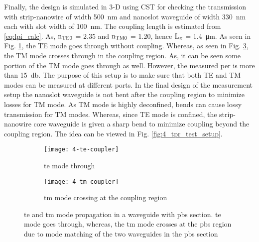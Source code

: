 \documentclass[../report.tex]{subfiles}
\begin{document}
\noindent Finally, the design is simulated in 3-D using CST for checking the transmission with strip-nanowire of width \SI{500}{\nano \meter} and nanoslot waveguide of width \SI{330}{\nano \meter} each with slot width of \SI{100}{\nano \meter}. The coupling length is estimated from \ref{eq:lpi_calc}. As, $\mathrm{n_{TE0}}$ = 2.35 and $\mathrm{n_{TM0}}$ = 1.20, hence $\mathrm{L_{\pi}}$ = \SI{1.4}{\micro\meter}. As seen in Fig. \ref{fig:4_te_coupler}, the TE mode goes through without coupling. Whereas, as seen in Fig. \ref{fig:4_tm_coupler}, the TM mode crosses through in the coupling region. As, it can be seen some portion of the TM mode goes through as well. However, the measured \gls{per} is more than \SI{15}{\decibel}. The purpose of this setup is to make sure that both TE and TM modes can be measured at different ports. In the final design of the measurement setup the nanoslot waveguide is not bent after the coupling region to minimize losses for TM mode. As TM mode is highly deconfined, bends can cause lossy transmission for TM modes. Whereas, since TE mode is confined, the strip-nanowire core waveguide is given a sharp bend to minimize coupling beyond the coupling region. The idea can be viewed in Fig. \ref{fig:4_tpr_test_setup}.

\begin{figure}[H] %
	\begin{subfigure}[t]{0.45\textwidth}
		\texttt{[image: 4-te-coupler]}
		\caption{\gls{te} mode through}
		\label{fig:4_te_coupler}
	\end{subfigure}
	\hfill
	\begin{subfigure}[t]{0.45\textwidth}
		\texttt{[image: 4-tm-coupler]}
		\caption{\gls{tm} mode crossing at the coupling region}
		\label{fig:4_tm_coupler}
	\end{subfigure}
	\caption{\gls{te} and \gls{tm} mode propagation in a waveguide with \gls{pbs} section. \gls{te} mode goes through, whereas, the \gls{tm} mode crosses at the \gls{pbs} region due to mode matching of the two waveguides in the \gls{pbs} section}
\end{figure}
\end{document}
